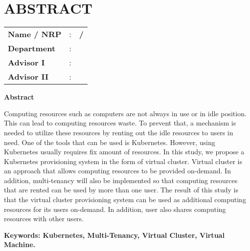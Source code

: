 \chapter*{ABSTRACT}


\vspace{2ex}

\begin{center}
  \large\textbf{\engtatitle{}}
\end{center}

\vspace{2ex}

\begingroup
\setlength{\tabcolsep}{0pt}

\noindent
\begin{tabularx}{\textwidth}{l >{\centering}m{3em} X}
  \textbf{Name / NRP} & : & \textbf{\name{} / \nrp{}} \\
  \textbf{Department} & : & \textbf{\engdepartment{}} \\
  \textbf{Advisor I}  & : & \textbf{\advisor{}}       \\
  \textbf{Advisor II} & : & \textbf{\coadvisor{}}     \\
\end{tabularx}
\endgroup

\noindent
\textbf{Abstract}

Computing resources such as computers are not always in use or in idle
position. This can lead to computing resources waste. To prevent that,
a mechanism is needed to utilize these resources  by renting out the
idle resources to users in need. One of the tools that can be used is Kubernetes.
However, using Kubernetes usually requires fix amount of resources. In this study,
we propose a Kubernetes provisioning system in the form of virtual cluster. Virtual
cluster is an approach that allows computing resources to be provided on-demand. In
addition, multi-tenancy will also be implemented so that computing resources that are
rented can be used by more than one user. The result of this study is that the virtual
cluster provisioning system can be used as additional computing resources for its users
on-demand. In addition, user also shares computing resources with other users.

\vspace{2ex}
\noindent
\textbf{Keywords: Kubernetes, Multi-Tenancy, Virtual Cluster, Virtual Machine.}
